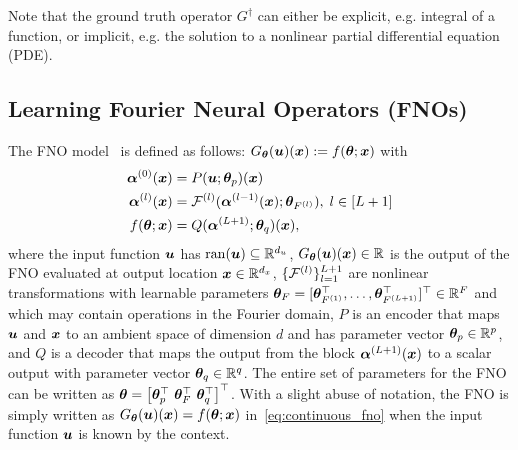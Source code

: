 Note that the ground truth operator $G^{\dagger}$  
can either be explicit, e.g. integral of a function, or implicit, e.g. the solution to a nonlinear partial differential equation (PDE). 

\subsection{Learning Fourier Neural Operators (FNOs)}
\label{subsec:FNO_setup} 
The FNO model~\citep{li_fourier_2021} is defined as follows: $G_{{\bm{\theta}}}({\bm{u}})({\bm{x}}):=f({\bm{\theta}};{\bm{x}})$ with 
\begin{equation}
\label{eq:continuous_fno}
\begin{aligned}
    \boldsymbol{\alpha}^{(0)}({\bm{x}}) &= P({\bm{u}};{\bm{\theta}}_p)({\bm{x}})\\ 
    \boldsymbol{\alpha}^{(l)}({\bm{x}}) &= {\mathcal{F}}^{(l)}(\boldsymbol{\alpha}^{(l-1)}({\bm{x}}); {\bm{\theta}}_{F^{{(l)}}}),\; l\in[L+1]\\ 
    f({\bm{\theta}};{\bm{x}}) &= Q(\boldsymbol{\alpha}^{({L+1})};{\bm{\theta}}_q)({\bm{x}}),
\end{aligned}
\end{equation} 
where the input function ${\bm{u}}$ has $\operatorname{ran}({\bm{u}})\subseteq{\mathbb{R}}^{d_u}$, 
$G_{{\bm{\theta}}}({\bm{u}})({\bm{x}})\in{\mathbb{R}}$ is the output of the FNO evaluated at output location ${\bm{x}}\in{\mathbb{R}}^{d_x}$,
$\{{\mathcal{F}}^{(l)}\}_{l=1}^{L+1}$ are nonlinear transformations with learnable parameters ${\bm{\theta}}_{F} = [{\bm{\theta}}_{F^{(1)}}^{\top}, \dots, {\bm{\theta}}_{F^{(L+1)}}^\top]^\top\in{\mathbb{R}}^{F}$ and which may contain operations in the Fourier domain, $P$ is an encoder that maps ${\bm{u}}$ and ${\bm{x}}$ to an ambient space of dimension $d$ and has parameter vector ${\bm{\theta}}_p\in{\mathbb{R}}^{p}$, and $Q$ is a decoder that maps the output from the block $\boldsymbol{\alpha}^{(L+1)}({\bm{x}})$ to a scalar output 
with parameter vector ${\bm{\theta}}_q\in{\mathbb{R}}^q$. 
The entire set of parameters for the FNO can be written as ${\bm{\theta}} = \left[ {\bm{\theta}}_p^{\top} \ {\bm{\theta}}_{F}^{\top}\ {\bm{\theta}}_q^{\top}\right]^{\top}$. 
With a slight abuse of notation, the FNO is simply written as $G_{{\bm{\theta}}}({\bm{u}})({\bm{x}})=f({\bm{\theta}};{\bm{x}})$ in~\eqref{eq:continuous_fno} when the input function ${\bm{u}}$ is known by the context.
%
%
%

